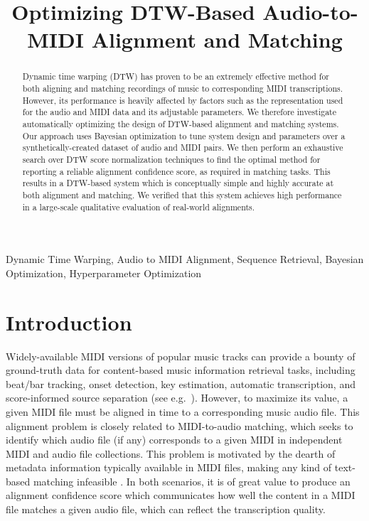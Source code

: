\documentclass{article}
\title{Optimizing DTW-Based Audio-to-MIDI Alignment and Matching}
\begin{document}
\ninept
\maketitle

\begin{abstract}
Dynamic time warping (DTW) has proven to be an extremely effective method for both aligning and matching recordings of music to corresponding MIDI transcriptions.
However, its performance is heavily affected by factors such as the representation used for the audio and MIDI data and its adjustable parameters.
We therefore investigate automatically optimizing the design of DTW-based alignment and matching systems.
Our approach uses Bayesian optimization to tune system design and parameters over a synthetically-created dataset of audio and MIDI pairs.
We then perform an exhaustive search over DTW score normalization techniques to find the optimal method for reporting a reliable alignment confidence score, as required in matching tasks.
This results in a DTW-based system which is conceptually simple and highly accurate at both alignment and matching.
We verified that this system achieves high performance in a large-scale qualitative evaluation of real-world alignments.
\end{abstract}

\begin{keywords}
Dynamic Time Warping, Audio to MIDI Alignment, Sequence Retrieval, Bayesian Optimization, Hyperparameter Optimization
\end{keywords}

\section{Introduction}
\label{sec:intro}

Widely-available MIDI versions of popular music tracks can provide a bounty of ground-truth data for content-based music information retrieval tasks, including beat/bar tracking, onset detection, key estimation, automatic transcription, and score-informed source separation (see e.g.\ \cite{ewert2012towards, turetsky2003ground, ewert2014score, raffel2014pretty_midi}).
However, to maximize its value, a given MIDI file must be aligned in time to a corresponding music audio file.
This alignment problem is closely related to MIDI-to-audio matching, which seeks to identify which  audio file (if any) corresponds to a given MIDI in independent MIDI and audio file collections.
This problem is motivated by the dearth of metadata information typically available in MIDI files, making any kind of text-based matching infeasible \cite{raffel2015large}.
In both scenarios, it is of great value to produce an alignment confidence score which communicates how well the content in a MIDI file matches a given audio file, which can reflect the transcription quality.
\end{document}
